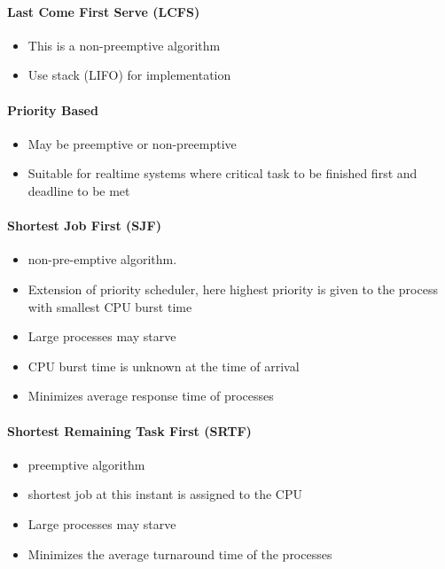 \paragraph{Last Come First Serve (LCFS)}
\begin{itemize}
	\item This is a non-preemptive algorithm
	\item Use stack (LIFO) for implementation
\end{itemize}
\paragraph{Priority Based}
\begin{itemize}
    \item May be preemptive or non-preemptive
	\item Suitable for realtime systems where critical task to be finished first and deadline to be met
\end{itemize}
\paragraph{Shortest Job First (SJF)}
\begin{itemize}
	\item non-pre-emptive algorithm.
    \item Extension of priority scheduler, here highest priority is given to the process with smallest CPU burst time
    \item Large processes may starve
    \item CPU burst time is unknown at the time of arrival
    \item Minimizes average response time of processes
\end{itemize}
\paragraph{Shortest Remaining Task First (SRTF)}
\begin{itemize}
	\item preemptive algorithm
    \item shortest job at this instant is assigned to the CPU
    \item Large processes may starve
    \item Minimizes the average turnaround time of the processes
\end{itemize}
